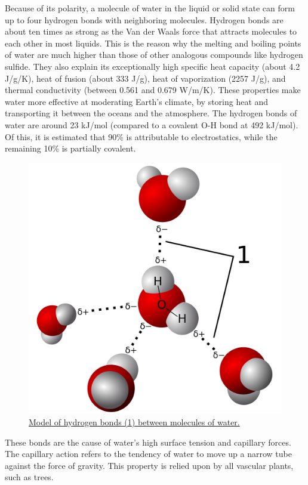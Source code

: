 Because of its polarity, a molecule of water in the liquid or solid state can form up to four hydrogen bonds with neighboring molecules. Hydrogen bonds are about ten times as strong as the Van der Waals force that attracts molecules to each other in most liquids. This is the reason why the melting and boiling points of water are much higher than those of other analogous compounds like hydrogen sulfide. They also explain its exceptionally high specific heat capacity (about 4.2 J/g/K), heat of fusion (about 333 J/g), heat of vaporization (2257 J/g), and thermal conductivity (between 0.561 and 0.679 W/m/K). These properties make water more effective at moderating Earth's climate, by storing heat and transporting it between the oceans and the atmosphere. The hydrogen bonds of water are around 23 kJ/mol (compared to a covalent O-H bond at 492 kJ/mol). Of this, it is estimated that 90\% is attributable to electrostatics, while the remaining 10\% is partially covalent.



\begin{figure}

{\centering \includegraphics[width=0.7\linewidth]{./figures/chemistry/3D_model_hydrogen_bonds_in_water} 

}

\caption{\href{https://commons.wikimedia.org/wiki/File:3D_model_hydrogen_bonds_in_water.svg}{Model of hydrogen bonds (1) between molecules of water.}}\label{fig:waterbonds}
\end{figure}

These bonds are the cause of water's high surface tension and capillary forces. The capillary action refers to the tendency of water to move up a narrow tube against the force of gravity. This property is relied upon by all vascular plants, such as trees.

